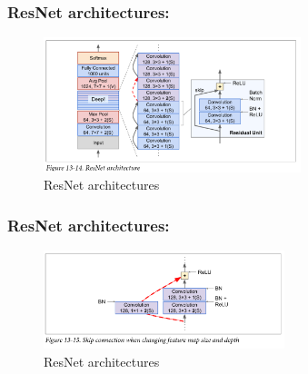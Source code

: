 \documentclass{beamer}
\begin{document}
    \begin{frame}
    \frametitle{ResNet architectures: }
         \begin{figure}[H]
            \begin{center}
                \includegraphics[width=7.5cm]{FIGURE13-6.png}
            \end{center}
        \caption{ResNet architectures}
        \end{figure}
    \end{frame}

    \begin{frame}
    \frametitle{ResNet architectures: }
         \begin{figure}[H]
            \begin{center}
                \includegraphics[width=7cm]{FIGURE13-7.png}
            \end{center}
        \caption{ResNet architectures}
        \end{figure}
    \end{frame}
    \begin{frame}
    \end{frame}
\end{document}
